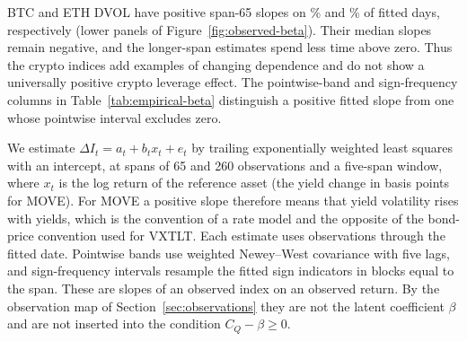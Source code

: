 BTC and ETH DVOL have positive span-65 slopes on \betaPosBTCDVOL\% and
\betaPosETHDVOL\% of fitted days, respectively (lower panels of
Figure~\ref{fig:observed-beta}). Their median slopes remain
negative, and the longer-span estimates spend less time above zero. Thus the
crypto indices add examples of changing dependence and do not show a universally
positive crypto leverage effect. The pointwise-band and sign-frequency columns
in Table~\ref{tab:empirical-beta} distinguish a positive fitted slope from one
whose pointwise interval excludes zero.

We estimate $\Delta I_t=a_t+b_t x_t+e_t$ by trailing exponentially weighted least
squares with an intercept, at spans of 65 and 260 observations and a five-span
window, where $x_t$ is the log return of the reference asset (the yield change in
basis points for MOVE). For MOVE a positive slope therefore means that yield
volatility rises with yields, which is the convention of a rate model and the
opposite of the bond-price convention used for VXTLT. Each estimate uses
observations through the fitted date.
Pointwise bands use weighted Newey--West covariance with five lags, and
sign-frequency intervals resample the fitted sign indicators in blocks equal to
the span. These are slopes of an observed index on an observed return. By the
observation map of Section~\ref{sec:observations} they are not the latent
coefficient $\beta$ and are not inserted into the condition $C_Q-\beta\geq0$.

